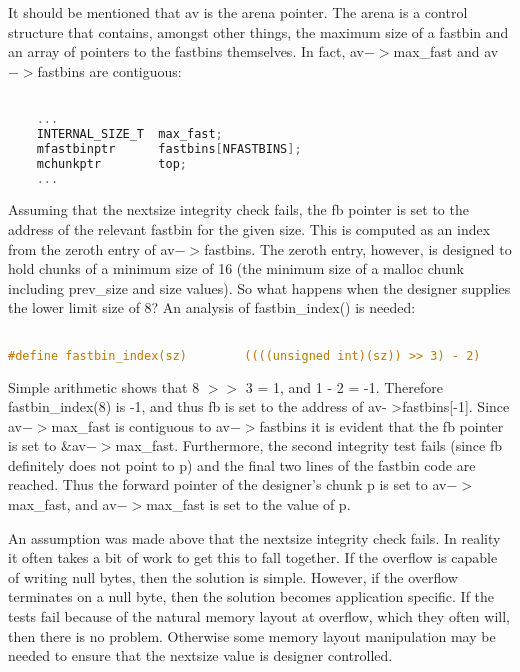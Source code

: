 \documentclass[12pt]{article}
\begin{document}
It should be mentioned that av is the arena pointer. The arena is a
control structure that contains, amongst other things, the maximum
size of a fastbin and an array of pointers to the fastbins
themselves. In fact, av$->$max\_fast and av$->$fastbins are contiguous:
\begin{lstlisting}[language=C]

    ...
    INTERNAL_SIZE_T  max_fast;
    mfastbinptr      fastbins[NFASTBINS];
    mchunkptr        top;
    ...
\end{lstlisting}
Assuming that the nextsize integrity check fails, the fb pointer is
set to the address of the relevant fastbin for the given size. This
is computed as an index from the zeroth entry of av$->$fastbins. The
zeroth entry, however, is designed to hold chunks of a minimum size
of 16 (the minimum size of a malloc chunk including prev\_size and
size values). So what happens when the designer supplies the lower
limit size of 8? An analysis of fastbin\_index() is needed:
\begin{lstlisting}[language=C]

#define fastbin_index(sz)        ((((unsigned int)(sz)) >> 3) - 2)
\end{lstlisting}
Simple arithmetic shows that 8 $>>$ 3 = 1, and 1 - 2 = -1. Therefore
fastbin\_index(8) is -1, and thus fb is set to the address of av-
>fastbins[-1]. Since av$->$max\_fast is contiguous to av$->$fastbins it
is evident that the fb pointer is set to \&av$->$max\_fast.
Furthermore, the second integrity test fails (since fb definitely
does not point to p) and the final two lines of the fastbin code
are reached. Thus the forward pointer of the designer's chunk p is
set to av$->$max\_fast, and av$->$max\_fast is set to the value of p.
\newline


An assumption was made above that the nextsize integrity check
fails. In reality it often takes a bit of work to get this to fall
together. If the overflow is capable of writing null bytes, then
the solution is simple. However, if the overflow terminates on a
null byte, then the solution becomes application specific. If the
tests fail because of the natural memory layout at overflow, which
they often will, then there is no problem. Otherwise some memory
layout manipulation may be needed to ensure that the nextsize value
is designer controlled.
\newline
\end{document}
